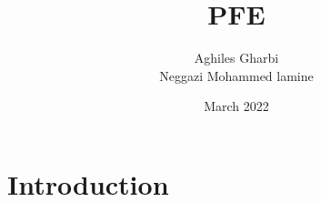 \documentclass{article}
\title{PFE}
\author{Aghiles Gharbi \\ Neggazi Mohammed lamine}
\date{March 2022}
\begin{document}
\maketitle

\section{Introduction}
\end{document}
